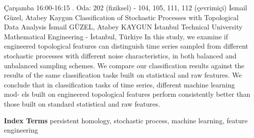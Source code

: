 
    \begin{abstract_basarim}
    {Çarşamba 16:00-16:15}
    {.}
    {Oda: 202 (fiziksel) - 104, 105, 111, 112 (çevrimiçi)}
    {İsmail Güzel, Atabey Kaygun}
    {Classification of Stochastic Processes with Topological Data Analysis}
    {%
    İsmail GÜZEL, Atabey KAYGUN}
    {%
    }
    {%
    İstanbul Technical University Mathematical Engineering - İstanbul, Türkiye}
    In this study, we examine if engineered topological features can distinguish time series sampled from different stochastic processes with different noise characteristics, in both balanced and unbalanced sampling schemes. We compare our classification results against the results of the same classification tasks built on statistical and raw features. We conclude that in classification tasks of time series, different machine learning mod- els built on engineered topological features perform consistently better than those built on standard statistical and raw features. 
    
            \textbf{Index Terms} \newline{}persistent homology, stochastic process, machine learning, feature engineering
    \end{abstract_basarim}
    